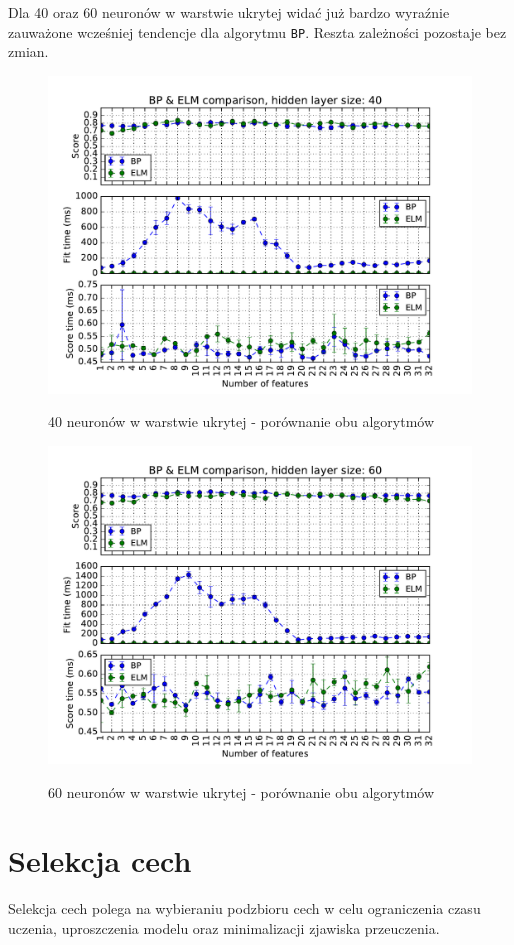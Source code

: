 \newpage

Dla 40 oraz 60 neuronów w warstwie ukrytej widać już bardzo wyraźnie zauważone wcześniej tendencje dla algorytmu \texttt{BP}. Reszta zależności pozostaje bez zmian.

\begin{figure}[h!]
	\centering
	\includegraphics[width=0.78\linewidth]{img/bp_elm_40.pdf}
	\label{Rysunek}
	\caption{40 neuronów w warstwie ukrytej - porównanie obu algorytmów}
\end{figure}

\begin{figure}[h!]
	\centering
	\includegraphics[width=0.78\linewidth]{img/bp_elm_60.pdf}
	\label{Rysunek}
	\caption{60 neuronów w warstwie ukrytej - porównanie obu algorytmów}
\end{figure}

\newpage

\section{Selekcja cech}
Selekcja cech polega na wybieraniu podzbioru cech w celu ograniczenia czasu uczenia, uproszczenia modelu oraz minimalizacji zjawiska przeuczenia.

